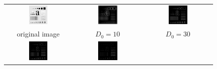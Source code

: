 \documentclass[11pt,a4paper]{article}
\begin{document}
\begin{figure}[!htbp]
	\centering
	\begin{tabular}{ccc} 
		\includegraphics[width=0.3\textwidth]{pro3/org}&
		\includegraphics[width=0.3\textwidth]{pro3/BHPF/BHPF_10}&
		\includegraphics[width=0.3\textwidth]{pro3/BHPF/BHPF_30} \\
		original image &  $D_0=10$ &  $D_0=30$\\
		\includegraphics[width=0.3\textwidth]{pro3/BHPF/BHPF_60}&
		\includegraphics[width=0.3\textwidth]{pro3/BHPF/BHPF_160}&

\end{tabular}
\end{figure}
\end{document}
